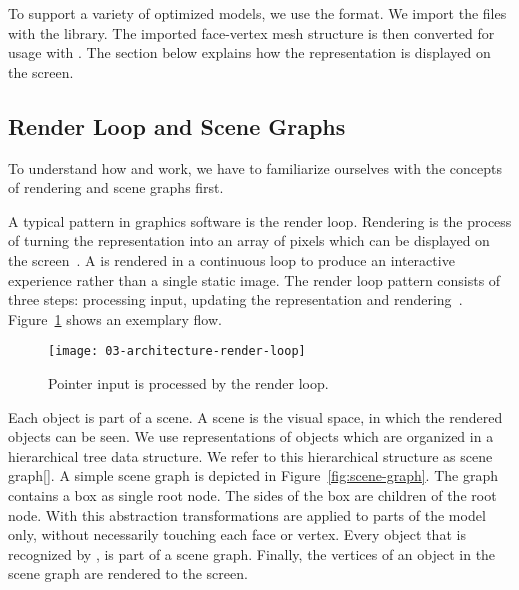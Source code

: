 \documentclass[../../ClassicThesis.tex]{subfiles}
\begin{document}
To support a variety of {\threedprinter} optimized models,
we use the {\stlfile} format. We import the files with the
{\meshlib} library. The imported face-vertex mesh structure
is then converted for usage with {\threejs}. The section
below explains how the {\threejs} representation is
displayed on the screen.

\subsection{Render Loop and Scene Graphs}
\label{sub:render-and-graph}

To understand how {\convertify} and {\platener} work, we
have to familiarize ourselves with the concepts of rendering
and scene graphs first.

A typical pattern in graphics software is the render loop.
Rendering is the process of turning the {\threedmodel}
representation into an array of pixels which can be
displayed on the screen~\cite[p.~2]{intro-cg}. A
{\threedmodel} is rendered in a continuous loop to produce
an interactive experience rather than a single static image.
The render loop pattern consists of three steps: processing
input, updating the {\threedmodel} representation and
rendering~\cite{gamedev-gameloop}.
Figure~\ref{fig:render-loop} shows an exemplary flow.

\begin{figure}[h]
  \centering
  \texttt{[image: 03-architecture-render-loop]}
  \caption{Pointer input is processed by the render loop.}
  \label{fig:render-loop}
\end{figure}

Each object is part of a scene. A scene is the visual space,
in which the rendered objects can be seen. We use
representations of objects which are organized in a
hierarchical tree data structure. We refer to this
hierarchical structure as scene graph\ref{}. A simple scene graph is
depicted in Figure~\ref{fig:scene-graph}. The graph contains
a box as single root node. The sides of the box are children
of the root node. With this abstraction transformations are
applied to parts of the model only, without necessarily
touching each face or vertex. Every object that is
recognized by {\convertify}, is part of a scene graph.
Finally, the vertices of an object in the scene graph are
rendered to the screen.
\end{document}
